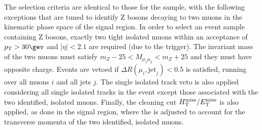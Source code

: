 The selection criteria are identical to those for the \mj sample, with
the following exceptions that are tuned to identify Z bosons decaying
to two muons in the kinematic phase space of the signal region. 
In order to select an event sample containing Z bosons, exactly two
tight isolated muons within an acceptance of $\Pt > 30\gev$ and
$|\eta| < 2.1$ are required (due to the trigger). The invariant mass
of the two muons must satisfy $m_{Z} - 25 < M_{\mu_1\mu_2} < m_{Z} +
25$ and they must have opposite charge. Events are vetoed if $\Delta
R(\mu_{i},\textrm{jet}_j) < 0.5$ is satisfied, running over all muons
$i$ and all jets $j$. The single isolated track veto is also applied
considering all single isolated tracks in the event except those
associated with the two identified, isolated muons. Finally, the
cleaning cut $\mbox{$H_{\rm T}^{\rm miss}$}/\mbox{$E_\text{T}^{\rm miss}$}$ is also applied, as done in the signal
region, where the \met is adjusted to account for the transverse
momenta of the two identified, isolated muons. 

%
%
%
%
%

